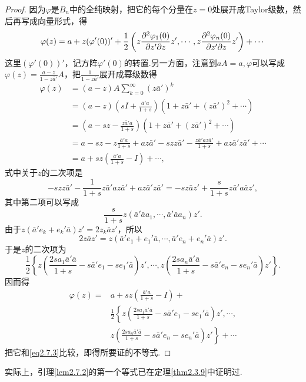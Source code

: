 \begin{proof}
	因为$\varphi$是$B_n$中的全纯映射，把它的每个分量在$z=0$处展开成Taylor级数，然后再写成向量形式，得
	\begin{equation}\label{eq2.7.3}
		\varphi(z)=a+z(\varphi'(0))'+\frac12\left(z\frac{\partial^2 \varphi_1(0)}{\partial z'\partial z}z',\cdots,z\frac{\partial^2 \varphi_n(0)}{\partial z'\partial z}z'\right)+\cdots
	\end{equation}
这里$(\varphi'(0))'$，记方阵$\varphi'(0)$的转置.另一方面，注意到$aA=a,\varphi$可以写成$\varphi(z)=\frac{a-z}{1-z\bar{a}'}A$，把$\frac1{1-z\bar{a}'}$展开成幂级数得
\begin{align*}
	\varphi(z)
	&=(a-z)A\sum_{k=0}^{\infty}(z\bar{a}')^k\\
	&=(a-z)\left(sI+\frac{\bar{a}'a}{1+s}\right)(1+z\bar{a}'+(z\bar{a}')^2+\cdots)\\
	&=\left(a-sz-\frac{z\bar{a}'a}{1+s}\right)(1+z\bar{a}'+(z\bar{a}')^2+\cdots)\\
	&=a-sz-z\frac{\bar{a}'a}{1+s}+az\bar{a}'-szz\bar{a}'-\frac{z\bar{a}'az\bar{a}'}{1+s}+az\bar{a}'z\bar{a}'+\cdots\\
	&=a+sz\left(\frac{\bar{a}'a}{1+s}-I\right)+\cdots,
\end{align*}
式中关于$z$的二次项是
\[-szz\bar{a}'-\frac1{1+s}z\bar{a}'az\bar{a}'+az\bar{a}'z\bar{a}'=-sz\bar{a}z'+\frac{s}{1+s}z\bar{a}'a\bar{a}z',\]
其中第二项可以写成
\[\frac{s}{1+s}z(\bar{a}'\bar{a}a_1,\cdots,\bar{a}'\bar{a}a_n)z'.\]
由于$z(\bar{a}'e_k+e_k' \bar{a})z'=2z_k\bar{a}z'$，所以
\[2z\bar{a}z'=z(\bar{a}'e_1+e_1'\bar{a},\cdots,\bar{a}'e_n+e_n'\bar{a})z'.\]
于是$z$的二次项为
\[\frac12\left\{z\left(\frac{2sa_1\bar{a}'\bar{a}}{1+s}-s\bar{a}'e_1-se_1'\bar{a}\right)z',\cdots,z\left(\frac{2sa_n\bar{a}'\bar{a}}{1+s}-s\bar{a}'e_n-se_n'\bar{a}\right)z'\right\}.\]
因而得
\begin{align*}
	\varphi(z)
	=&a+sz\left(\frac{\bar{a}'a}{1+s}-I\right)+\\
	&\frac12\left\{z\left(\frac{2sa_1\bar{a}'\bar{a}}{1+s}-s\bar{a}'e_1-se_1'\bar{a}\right)z',\cdots,\right.\\
	&\left. z\left(\frac{2sa_n\bar{a}'\bar{a}}{1+s}-s\bar{a}'e_n-se_n'\bar{a}\right)z'\right\}+\cdots
\end{align*}
把它和\eqref{eq2.7.3}比较，即得所要证的不等式.
\end{proof}
实际上，引理\ref{lem2.7.2}的第一个等式已在定理\ref{thm2.3.9}中证明过.

